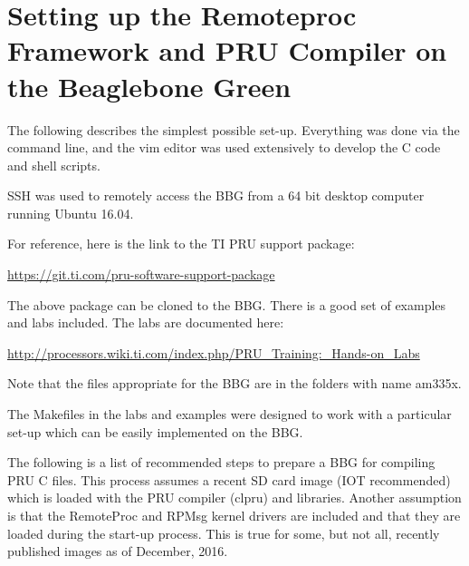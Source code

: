 %
%
%

\chapter{Setting up the Remoteproc Framework and PRU Compiler on the Beaglebone Green}

The following describes the simplest possible set-up.  Everything was done via the command line, and the vim editor was used extensively to develop the C code and shell scripts.

SSH was used to remotely access the BBG from a 64 bit desktop computer running Ubuntu 16.04.

For reference, here is the link to the TI PRU support package:

\url{https://git.ti.com/pru-software-support-package}

The above package can be cloned to the BBG.  There is a good set of examples and labs included.  The labs are documented here:

\url{http://processors.wiki.ti.com/index.php/PRU_Training:_Hands-on_Labs}

Note that the files appropriate for the BBG are in the folders with name am335x.

The Makefiles in the labs and examples were designed to work with a particular set-up which can be easily implemented on the BBG.

The following is a list of recommended steps to prepare a BBG for compiling PRU C files.
This process assumes a recent SD card image (IOT recommended) which is loaded with the PRU compiler (clpru) and libraries.  Another assumption is that the RemoteProc and RPMsg kernel drivers are included and that they are loaded during the start-up process.  This is true for some, but not all, recently published images as of December, 2016.

